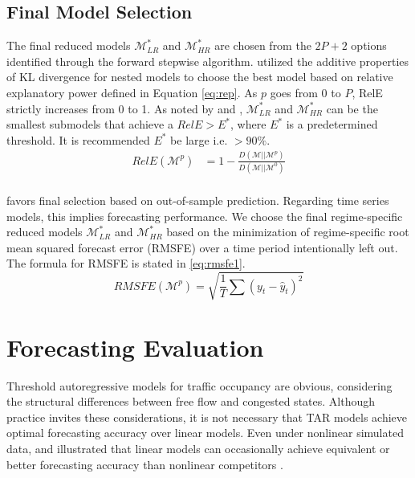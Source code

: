 \subsection{Final Model Selection}
The final reduced models $\mathcal{M}^*_{LR}$ and $\mathcal{M}^*_{HR}$ are chosen from the $2P+2$ options identified through the forward stepwise algorithm. \cite{Dupuis2003} utilized the additive properties of KL divergence for nested models to choose the best model based on relative explanatory power defined in Equation \ref{eq:rep}. As $p$ goes from $0$ to $P$, RelE strictly increases from 0 to 1. As noted by \cite{Dupuis2003} and \cite{Piironen2017}, $\mathcal{M}^*_{LR}$ and $\mathcal{M}^*_{HR}$ can be the smallest submodels that achieve a $RelE > E^*$, where $E^*$ is a predetermined threshold. It is recommended $E^*$ be large i.e. $>90\%$.
\begin{equation}
\label{eq:rep}
\begin{split}
RelE(\mathcal{M}^p)&=1-\frac{D(\mathcal{M}||\mathcal{M}^p)}{D(\mathcal{M}||\mathcal{M}^0)}\\
\end{split}
\end{equation}

\cite{Piironen2015,Piironen2017} favors final selection based on out-of-sample prediction. Regarding time series models, this implies forecasting performance. We choose the final regime-specific reduced models $\mathcal{M}^*_{LR}$ and $\mathcal{M}^*_{HR}$ based on the minimization of  regime-specific root mean squared forecast error (RMSFE) over a time period intentionally left out. The formula for RMSFE is stated in \ref{eq:rmsfe1}.
\begin{equation}
 	\label{eq:rmsfe1}
  RMSFE(\mathcal{M}^p)=\sqrt{\frac{1}{T}\sum (y_t-\hat{y}_t)^2}
\end{equation}










\section{Forecasting Evaluation}
Threshold autoregressive models for traffic occupancy are obvious, considering the structural differences between free flow and congested states. Although practice invites these considerations, it is not necessary that TAR models achieve optimal forecasting accuracy over linear models. Even under nonlinear simulated data, \cite{Davies1988} and \cite{Pemberton1989} illustrated that linear models can occasionally achieve equivalent or better forecasting accuracy than nonlinear competitors \citep{Guo1997,Stock1998a,Dacco1999}.

